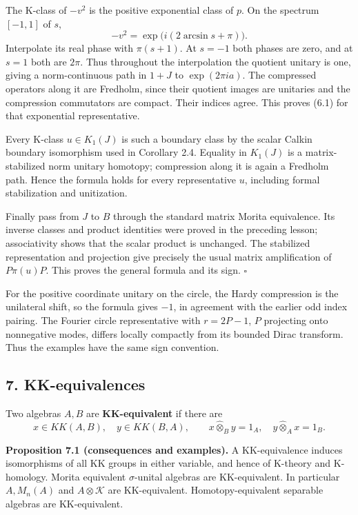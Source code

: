 \documentclass[
  11pt,
]{article}
\begin{document}
The K-class of \(-v^2\) is the positive exponential class of \(p\). On
the spectrum \([-1,1]\) of \(s\), \[
-v^2=\exp\bigl(i(2\arcsin s+\pi)\bigr).
\] Interpolate its real phase with \(\pi(s+1)\). At \(s=-1\) both phases
are zero, and at \(s=1\) both are \(2\pi\). Thus throughout the
interpolation the quotient unitary is one, giving a norm-continuous path
in \(1+J\) to \(\exp(2\pi i a)\). The compressed operators along it are
Fredholm, since their quotient images are unitaries and the compression
commutators are compact. Their indices agree. This proves (6.1) for that
exponential representative.

Every K-class \(u\in K_1(J)\) is such a boundary class by the scalar
Calkin boundary isomorphism used in Corollary 2.4. Equality in
\(K_1(J)\) is a matrix-stabilized norm unitary homotopy; compression
along it is again a Fredholm path. Hence the formula holds for every
representative \(u\), including formal stabilization and unitization.

Finally pass from \(J\) to \(B\) through the standard matrix Morita
equivalence. Its inverse classes and product identities were proved in
the preceding lesson; associativity shows that the scalar product is
unchanged. The stabilized representation and projection give precisely
the usual matrix amplification of \(P\pi(u)P\). This proves the general
formula and its sign. \(\square\)

For the positive coordinate unitary on the circle, the Hardy compression
is the unilateral shift, so the formula gives \(-1\), in agreement with
the earlier odd index pairing. The Fourier circle representative with
\(r=2P-1\), \(P\) projecting onto nonnegative modes, differs locally
compactly from its bounded Dirac transform. Thus the examples have the
same sign convention.

\subsection{7. KK-equivalences}\label{kk-equivalences}

Two algebras \(A,B\) are \textbf{KK-equivalent} if there are \[
x\in KK(A,B),\quad y\in KK(B,A),\qquad
x\widehat\otimes_B y=1_A,\quad
y\widehat\otimes_A x=1_B.
\tag{7.1}
\]

\textbf{Proposition 7.1 (consequences and examples).} A KK-equivalence
induces isomorphisms of all KK groups in either variable, and hence of
K-theory and K-homology. Morita equivalent \(\sigma\)-unital algebras
are KK-equivalent. In particular \(A,M_n(A)\) and \(A\otimes\mathcal K\)
are KK-equivalent. Homotopy-equivalent separable algebras are
KK-equivalent.
\end{document}
